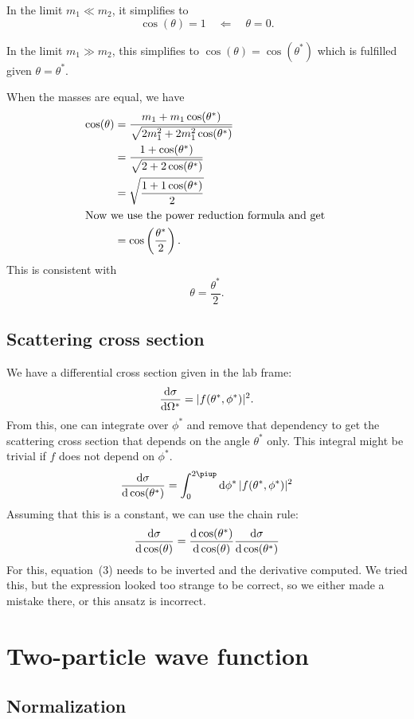 \documentclass[11pt, english, fleqn, DIV=15, headinclude, BCOR=1.5cm]{scrartcl}
\begin{document}

In the limit $m_1 \ll m_2$, it simplifies to
\[
    \cos(\theta) = 1
    \quad\Longleftarrow\quad
    \theta = 0.
\]

In the limit $m_1 \gg m_2$, this simplifies to $\cos(\theta) = \cos(\theta^*)$
which is fulfilled given $\theta = \theta^*$.

When the masses are equal, we have
\begin{align*}
    \cos(\theta)
    &= \frac{m_1 + m_1 \cos(\theta^*)}{\sqrt{2 m_1^2 + 2m_1^2 \cos(\theta^*)}} \\
    &= \frac{1 + \cos(\theta^*)}{\sqrt{2 + 2\cos(\theta^*)}} \\
    &= \sqrt{\frac{1 + 1\cos(\theta^*)}2} \\
    \intertext{%
        Now we use the power reduction formula and get
    }
    &= \cos\del{\frac{\theta^*}{2}}.
\end{align*}
This is consistent with
\[
    \theta = \frac{\theta^*}2.
\]


\subsection{Scattering cross section}

We have a differential cross section given in the lab frame:
\[
    \frac{\mathop{}\!\mathrm d {\sigma}}{\mathop{}\!\mathrm d {\Omega^*}} = |f(\theta^*, \phi^*)|^2.
\]
From this, one can integrate over $\phi^*$ and remove that dependency to get
the scattering cross section that depends on the angle $\theta^*$ only. This
integral might be trivial if $f$ does not depend on $\phi^*$.
\[
    \od{\sigma}{\,\cos(\theta^*)} = \int_0^{2\piup} \dif \phi^* \, |f(\theta^*, \phi^*)|^2
\]
Assuming that this is a constant, we can use the chain rule:
\[
    \frac{\mathop{}\!\mathrm d {\sigma}}{\mathop{}\!\mathrm d {\, \cos(\theta)}}
    = \frac{\mathop{}\!\mathrm d {\, \cos(\theta^*)}}{\mathop{}\!\mathrm d {\, \cos(\theta)}} \frac{\mathop{}\!\mathrm d {\sigma}}{\mathop{}\!\mathrm d {\, \cos(\theta^*)}}
\]
For this, equation~(3) needs to be inverted and the derivative computed. We
tried this, but the expression looked too strange to be correct, so we either
made a mistake there, or this ansatz is incorrect.


\section{Two-particle wave function}

\subsection{Normalization}
\end{document}

